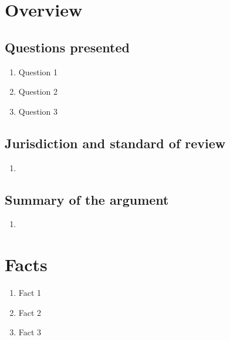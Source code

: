 \section{Overview}
\subsection{Questions presented}

\begin{enumerate}
    \item Question 1
    
    \item Question 2
    
    \item Question 3
    
\end{enumerate}

\pagebreak

\subsection{Jurisdiction and standard of review}

\begin{enumerate}
    \item 
\end{enumerate}

\pagebreak

\subsection{Summary of the argument}

\begin{enumerate}
    \item 
\end{enumerate}

\pagebreak

\section{Facts}

\begin{enumerate}
    \item Fact 1
    
    \item Fact 2
    
    \item Fact 3
    
\end{enumerate}


